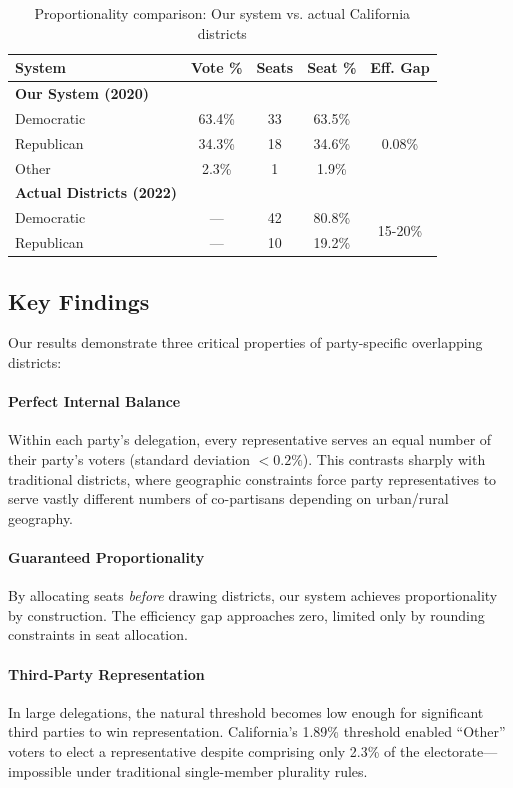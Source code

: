 \begin{table}[h]
\centering
\caption{Proportionality comparison: Our system vs. actual California districts}
\label{tab:proportionality}
\begin{tabular}{lcccc}
\toprule
System & Vote \% & Seats & Seat \% & Eff. Gap \\
\midrule
\textbf{Our System (2020)} \\
\quad Democratic & 63.4\% & 33 & 63.5\% & \multirow{3}{*}{0.08\%} \\
\quad Republican & 34.3\% & 18 & 34.6\% & \\
\quad Other & 2.3\% & 1 & 1.9\% & \\
\midrule
\textbf{Actual Districts (2022)} \\
\quad Democratic & --- & 42 & 80.8\% & \multirow{2}{*}{15-20\%} \\
\quad Republican & --- & 10 & 19.2\% & \\
\bottomrule
\end{tabular}
\end{table}

\subsection{Key Findings}

Our results demonstrate three critical properties of party-specific overlapping districts:

\paragraph{Perfect Internal Balance}
Within each party's delegation, every representative serves an equal number of their party's voters (standard deviation $< 0.2\%$). This contrasts sharply with traditional districts, where geographic constraints force party representatives to serve vastly different numbers of co-partisans depending on urban/rural geography.

\paragraph{Guaranteed Proportionality}
By allocating seats \emph{before} drawing districts, our system achieves proportionality by construction. The efficiency gap approaches zero, limited only by rounding constraints in seat allocation.

\paragraph{Third-Party Representation}
In large delegations, the natural threshold becomes low enough for significant third parties to win representation. California's 1.89\% threshold enabled ``Other'' voters to elect a representative despite comprising only 2.3\% of the electorate---impossible under traditional single-member plurality rules.

